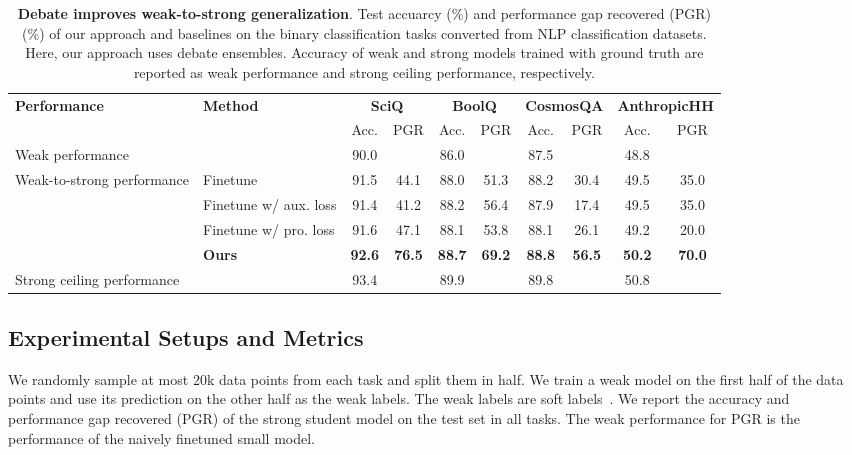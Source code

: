 \documentclass[letterpaper]{article} %
\begin{document}
\begin{table}[t]
    \centering
    \small
    
    \begin{tabular}{l|l|cc|cc|cc|cc}
    \toprule
    \multicolumn{1}{l|}{\multirow{2}{*}{\textbf{Performance}}} & \multicolumn{1}{l|}{\multirow{2}{*}{\textbf{Method}}} & \multicolumn{2}{c|}{\textbf{SciQ}} & \multicolumn{2}{c|}{\textbf{BoolQ}} & \multicolumn{2}{c|}{\textbf{CosmosQA}} & \multicolumn{2}{c}{\textbf{AnthropicHH}} \\
    \multicolumn{1}{l|}{} & \multicolumn{1}{l|}{} &  Acc. &  PGR &  Acc. &  PGR &  Acc. &  PGR &  Acc. &  PGR \\
    \midrule
    Weak performance & & 90.0 &   & 86.0 &  & 87.5 &  & 48.8 &  \\
    \midrule
    \multirow{4}{*}{Weak-to-strong performance} & Finetune & 91.5 & 44.1 & 88.0 & 51.3& 88.2 & 30.4& 49.5 & 35.0\\
    & Finetune w/ aux. loss & 91.4 & 41.2 & 88.2 & 56.4& 87.9 & 17.4& 49.5 & 35.0\\
    & Finetune w/ pro. loss & 91.6 & 47.1 & 88.1 & 53.8& 88.1 & 26.1&  49.2 & 20.0\\
    & \textbf{Ours} & \textbf{92.6} & \textbf{76.5} & \textbf{88.7} & \textbf{69.2} & \textbf{88.8} & \textbf{56.5}& \textbf{50.2} & \textbf{70.0}\\
    \midrule
    Strong ceiling performance & & 93.4 &   & 89.9 &  & 89.8 &  & 50.8 &  \\
    \bottomrule
    \end{tabular}
    \caption{\textbf{Debate improves weak-to-strong generalization}. Test accuarcy (\%) and performance gap recovered (PGR) (\%) of our approach and baselines on the binary classification tasks converted from NLP classification datasets. Here, our approach uses debate ensembles. Accuracy of weak and strong models trained with ground truth are reported as weak performance and strong ceiling performance, respectively. }
    \label{tab:main_result}
\end{table}

\subsection{Experimental Setups and Metrics}

We randomly sample at most 20k data points from each task and split them in half.
We train a weak model on the first half of the data points and use its prediction on the other half as the weak labels.
The weak labels are soft labels~\cite{hinton2015distilling}.
We report the accuracy and performance gap recovered (PGR) of the strong student model on the test set in all tasks.
The weak performance for PGR is the performance of the naively finetuned small model.
\end{document}
